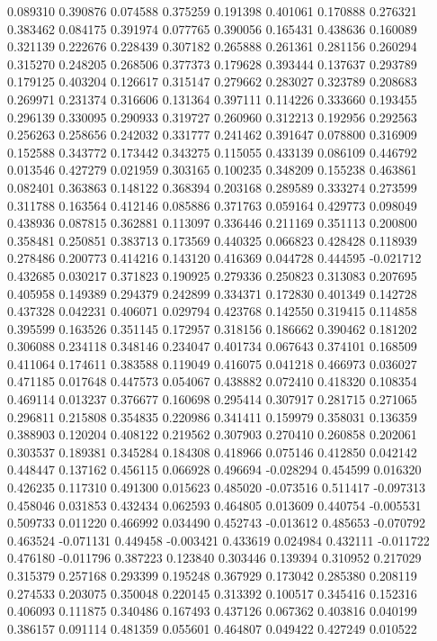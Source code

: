 0.089310
0.390876
0.074588
0.375259
0.191398
0.401061
0.170888
0.276321
0.383462
0.084175
0.391974
0.077765
0.390056
0.165431
0.438636
0.160089
0.321139
0.222676
0.228439
0.307182
0.265888
0.261361
0.281156
0.260294
0.315270
0.248205
0.268506
0.377373
0.179628
0.393444
0.137637
0.293789
0.179125
0.403204
0.126617
0.315147
0.279662
0.283027
0.323789
0.208683
0.269971
0.231374
0.316606
0.131364
0.397111
0.114226
0.333660
0.193455
0.296139
0.330095
0.290933
0.319727
0.260960
0.312213
0.192956
0.292563
0.256263
0.258656
0.242032
0.331777
0.241462
0.391647
0.078800
0.316909
0.152588
0.343772
0.173442
0.343275
0.115055
0.433139
0.086109
0.446792
0.013546
0.427279
0.021959
0.303165
0.100235
0.348209
0.155238
0.463861
0.082401
0.363863
0.148122
0.368394
0.203168
0.289589
0.333274
0.273599
0.311788
0.163564
0.412146
0.085886
0.371763
0.059164
0.429773
0.098049
0.438936
0.087815
0.362881
0.113097
0.336446
0.211169
0.351113
0.200800
0.358481
0.250851
0.383713
0.173569
0.440325
0.066823
0.428428
0.118939
0.278486
0.200773
0.414216
0.143120
0.416369
0.044728
0.444595
-0.021712
0.432685
0.030217
0.371823
0.190925
0.279336
0.250823
0.313083
0.207695
0.405958
0.149389
0.294379
0.242899
0.334371
0.172830
0.401349
0.142728
0.437328
0.042231
0.406071
0.029794
0.423768
0.142550
0.319415
0.114858
0.395599
0.163526
0.351145
0.172957
0.318156
0.186662
0.390462
0.181202
0.306088
0.234118
0.348146
0.234047
0.401734
0.067643
0.374101
0.168509
0.411064
0.174611
0.383588
0.119049
0.416075
0.041218
0.466973
0.036027
0.471185
0.017648
0.447573
0.054067
0.438882
0.072410
0.418320
0.108354
0.469114
0.013237
0.376677
0.160698
0.295414
0.307917
0.281715
0.271065
0.296811
0.215808
0.354835
0.220986
0.341411
0.159979
0.358031
0.136359
0.388903
0.120204
0.408122
0.219562
0.307903
0.270410
0.260858
0.202061
0.303537
0.189381
0.345284
0.184308
0.418966
0.075146
0.412850
0.042142
0.448447
0.137162
0.456115
0.066928
0.496694
-0.028294
0.454599
0.016320
0.426235
0.117310
0.491300
0.015623
0.485020
-0.073516
0.511417
-0.097313
0.458046
0.031853
0.432434
0.062593
0.464805
0.013609
0.440754
-0.005531
0.509733
0.011220
0.466992
0.034490
0.452743
-0.013612
0.485653
-0.070792
0.463524
-0.071131
0.449458
-0.003421
0.433619
0.024984
0.432111
-0.011722
0.476180
-0.011796
0.387223
0.123840
0.303446
0.139394
0.310952
0.217029
0.315379
0.257168
0.293399
0.195248
0.367929
0.173042
0.285380
0.208119
0.274533
0.203075
0.350048
0.220145
0.313392
0.100517
0.345416
0.152316
0.406093
0.111875
0.340486
0.167493
0.437126
0.067362
0.403816
0.040199
0.386157
0.091114
0.481359
0.055601
0.464807
0.049422
0.427249
0.010522

